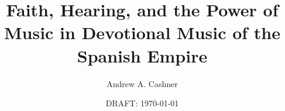 \documentclass[ms]{vcbook}
\title{Faith, Hearing, and the Power of Music 
in Devotional Music of the Spanish Empire}
\author{Andrew A. Cashner}
\date{DRAFT: \today}
\begin{document}
\maketitle

\tableofcontents
\listoftables
\listoffigures
\listofmusicexamples
\listofpoemexamples



\printbibliography
\end{document}
